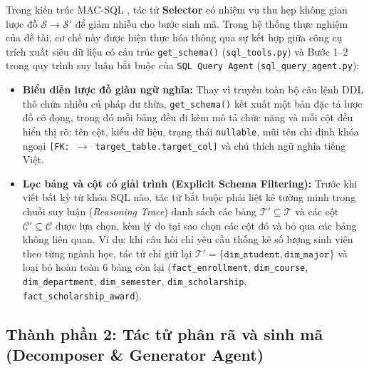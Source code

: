 \documentclass[12pt,a4paper]{report}
\begin{document}
Trong kiến trúc MAC-SQL \cite{wang2025macsql}, tác tử \textbf{Selector} có nhiệm vụ thu hẹp không gian lược đồ $\mathcal{S} \rightarrow \mathcal{S}'$ để giảm nhiễu cho bước sinh mã. Trong hệ thống thực nghiệm của đề tài, cơ chế này được hiện thực hóa thông qua sự kết hợp giữa công cụ trích xuất siêu dữ liệu có cấu trúc \texttt{get\_schema()} (\texttt{sql\_tools.py}) và Bước 1--2 trong quy trình suy luận bắt buộc của \texttt{SQL Query Agent} (\texttt{sql\_query\_agent.py}):
\begin{itemize}
    \item \textbf{Biểu diễn lược đồ giàu ngữ nghĩa:} Thay vì truyền toàn bộ câu lệnh DDL thô chứa nhiều cú pháp dư thừa, \texttt{get\_schema()} kết xuất một bản đặc tả lược đồ cô đọng, trong đó mỗi bảng đều đi kèm mô tả chức năng và mỗi cột đều hiển thị rõ: tên cột, kiểu dữ liệu, trạng thái \texttt{nullable}, mũi tên chỉ định khóa ngoại \texttt{[FK: $\rightarrow$ target\_table.target\_col]} và chú thích ngữ nghĩa tiếng Việt.
    \item \textbf{Lọc bảng và cột có giải trình (Explicit Schema Filtering):} Trước khi viết bất kỳ từ khóa SQL nào, tác tử bắt buộc phải liệt kê tường minh trong chuỗi suy luận (\textit{Reasoning Trace}) danh sách các bảng $\mathcal{T}' \subseteq \mathcal{T}$ và các cột $\mathcal{C}' \subseteq \mathcal{C}$ được lựa chọn, kèm lý do tại sao chọn các cột đó và bỏ qua các bảng không liên quan. Ví dụ: khi câu hỏi chỉ yêu cầu thống kê số lượng sinh viên theo từng ngành học, tác tử chỉ giữ lại $\mathcal{T}' = \{\texttt{dim\_student}, \texttt{dim\_major}\}$ và loại bỏ hoàn toàn 6 bảng còn lại (\texttt{fact\_enrollment}, \texttt{dim\_course}, \texttt{dim\_department}, \texttt{dim\_semester}, \texttt{dim\_scholarship}, \texttt{fact\_scholarship\_award}).
\end{itemize}

\subsection{Thành phần 2: Tác tử phân rã và sinh mã (Decomposer \& Generator Agent)}
\end{document}
